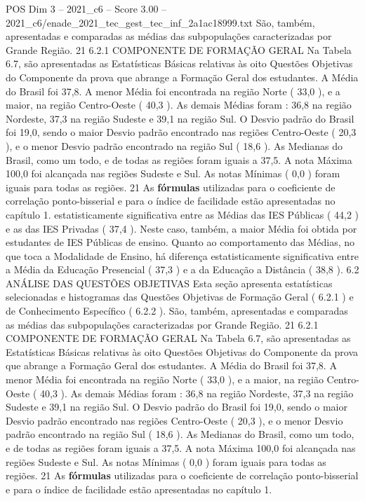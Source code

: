 \begin{textsample}{POS Dim 3 – 2021\_c6 – Score 3.00 – 2021\_c6/enade\_2021\_tec\_gest\_tec\_inf\_2a1ac18999.txt}
São, também, apresentadas e comparadas as médias das subpopulações caracterizadas por Grande Região. 21 6.2.1 COMPONENTE DE FORMAÇÃO GERAL Na Tabela 6.7, são apresentadas as Estatísticas Básicas relativas às oito Questões Objetivas do Componente da prova que abrange a Formação Geral dos estudantes.
A Média do Brasil foi 37,8.
A menor Média foi encontrada na região Norte ( 33,0 ), e a maior, na região Centro-Oeste ( 40,3 ).
As demais Médias foram : 36,8 na região Nordeste, 37,3 na região Sudeste e 39,1 na região Sul.
O Desvio padrão do Brasil foi 19,0, sendo o maior Desvio padrão encontrado nas regiões Centro-Oeste ( 20,3 ), e o menor Desvio padrão encontrado na região Sul ( 18,6 ).
As Medianas do Brasil, como um todo, e de todas as regiões foram iguais a 37,5.
A nota Máxima 100,0 foi alcançada nas regiões Sudeste e Sul.
As notas Mínimas ( 0,0 ) foram iguais para todas as regiões. 21 As \textbf{fórmulas} utilizadas para o coeficiente de correlação ponto-bisserial e para o índice de facilidade estão apresentadas no capítulo 1. estatisticamente significativa entre as Médias das IES Públicas ( 44,2 ) e as das IES Privadas ( 37,4 ).
Neste caso, também, a maior Média foi obtida por estudantes de IES Públicas de ensino.
Quanto ao comportamento das Médias, no que toca a Modalidade de Ensino, há diferença estatisticamente significativa entre a Média da Educação Presencial ( 37,3 ) e a da Educação a Distância ( 38,8 ). 6.2 ANÁLISE DAS QUESTÕES OBJETIVAS Esta seção apresenta estatísticas selecionadas e histogramas das Questões Objetivas de Formação Geral ( 6.2.1 ) e de Conhecimento Específico ( 6.2.2 ).
São, também, apresentadas e comparadas as médias das subpopulações caracterizadas por Grande Região. 21 6.2.1 COMPONENTE DE FORMAÇÃO GERAL Na Tabela 6.7, são apresentadas as Estatísticas Básicas relativas às oito Questões Objetivas do Componente da prova que abrange a Formação Geral dos estudantes.
A Média do Brasil foi 37,8.
A menor Média foi encontrada na região Norte ( 33,0 ), e a maior, na região Centro-Oeste ( 40,3 ).
As demais Médias foram : 36,8 na região Nordeste, 37,3 na região Sudeste e 39,1 na região Sul.
O Desvio padrão do Brasil foi 19,0, sendo o maior Desvio padrão encontrado nas regiões Centro-Oeste ( 20,3 ), e o menor Desvio padrão encontrado na região Sul ( 18,6 ).
As Medianas do Brasil, como um todo, e de todas as regiões foram iguais a 37,5.
A nota Máxima 100,0 foi alcançada nas regiões Sudeste e Sul.
As notas Mínimas ( 0,0 ) foram iguais para todas as regiões. 21 As \textbf{fórmulas} utilizadas para o coeficiente de correlação ponto-bisserial e para o índice de facilidade estão apresentadas no capítulo 1.

\end{textsample}
